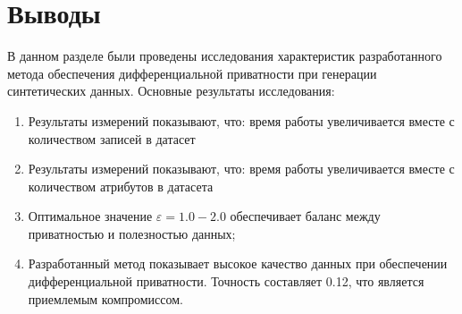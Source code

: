 \newpage
\section{Выводы}

В данном разделе были проведены исследования характеристик разработанного метода обеспечения дифференциальной приватности при генерации синтетических данных.
Основные результаты исследования:
\begin{enumerate}[label*=---]
	\item Результаты измерений показывают, что: время работы увеличивается вместе с количеством записей в датасет
	\item Результаты измерений показывают, что: время работы увеличивается вместе с количеством атрибутов в датасета
	\item Оптимальное значение $\varepsilon = 1.0{-}2.0$ обеспечивает баланс между приватностью и полезностью данных;
	\item Разработанный метод показывает высокое качество данных при обеспечении дифференциальной приватности. Точность составляет 0.12, что является приемлемым компромиссом.
\end{enumerate}

